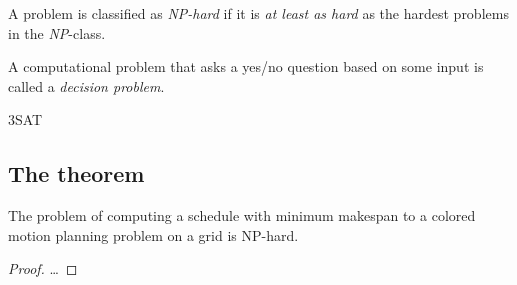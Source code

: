 \begin{definition}
	A problem is classified as \emph{NP-hard} if it is \emph{at least as hard} as the hardest problems in the \emph{NP}-class. 
\end{definition}

A computational problem that asks a yes/no question based on some input is called a \emph{decision problem}.

\begin{definition}
	3SAT
\end{definition}

\subsection{The theorem}

\begin{theorem}
	The problem of computing a schedule with minimum makespan to a colored motion planning problem on a grid is NP-hard.
\end{theorem}

\begin{proof}
	\dots
\end{proof}
